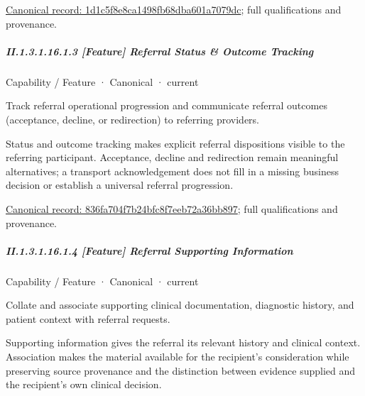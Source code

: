 {\footnotesize \href{../../../../../../../continuum/strategy/capability/feature/1d1c5f8e8ca1498fb68dba601a7079dc.md}{Canonical record: 1d1c5f8e8ca1498fb68dba601a7079dc}; full qualifications and provenance.}\par
\subparagraph*{II.1.3.1.16.1.3 [Feature] Referral Status \& Outcome Tracking}
\label{navigation:II.1.3.1.16.1.3}

\label{element:836fa704f7b24bfc8f7eeb72a36bb897}
{\small Capability / Feature · Canonical · current}\par

Track referral operational progression and communicate referral outcomes (acceptance, decline, or redirection) to referring providers.



Status and outcome tracking makes explicit referral dispositions visible to the referring participant. Acceptance, decline and redirection remain meaningful alternatives; a transport acknowledgement does not fill in a missing business decision or establish a universal referral progression.


{\footnotesize \href{../../../../../../../continuum/strategy/capability/feature/836fa704f7b24bfc8f7eeb72a36bb897.md}{Canonical record: 836fa704f7b24bfc8f7eeb72a36bb897}; full qualifications and provenance.}\par
\subparagraph*{II.1.3.1.16.1.4 [Feature] Referral Supporting Information}
\label{navigation:II.1.3.1.16.1.4}

\label{element:c8a50c0e932847d7b7d0289101aacd98}
{\small Capability / Feature · Canonical · current}\par

Collate and associate supporting clinical documentation, diagnostic history, and patient context with referral requests.



Supporting information gives the referral its relevant history and clinical context. Association makes the material available for the recipient's consideration while preserving source provenance and the distinction between evidence supplied and the recipient's own clinical decision.


